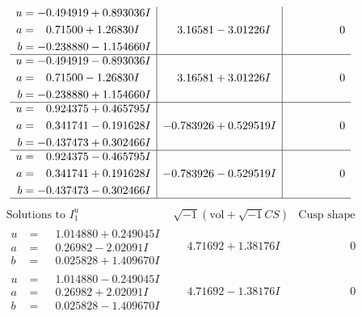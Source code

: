 \documentclass[1p]{elsarticle_modified}
\theoremstyle{definition}
\newcommand{\I}{\sqrt{-1}}
\begin{document}
$$\begin{array}{c|c|c}
\begin{aligned}
u &= -0.494919 + 0.893036 I \\
a &= \phantom{-}0.71500 + 1.26830 I \\
b &= -0.238880 - 1.154660 I\end{aligned}
 & \phantom{-}3.16581 - 3.01226 I & \phantom{-0.000000 } 0 \\ \hline\begin{aligned}
u &= -0.494919 - 0.893036 I \\
a &= \phantom{-}0.71500 - 1.26830 I \\
b &= -0.238880 + 1.154660 I\end{aligned}
 & \phantom{-}3.16581 + 3.01226 I & \phantom{-0.000000 } 0 \\ \hline\begin{aligned}
u &= \phantom{-}0.924375 + 0.465795 I \\
a &= \phantom{-}0.341741 - 0.191628 I \\
b &= -0.437473 + 0.302466 I\end{aligned}
 & -0.783926 + 0.529519 I & \phantom{-0.000000 } 0 \\ \hline\begin{aligned}
u &= \phantom{-}0.924375 - 0.465795 I \\
a &= \phantom{-}0.341741 + 0.191628 I \\
b &= -0.437473 - 0.302466 I\end{aligned}
 & -0.783926 - 0.529519 I & \phantom{-0.000000 } 0\\
 \hline 
 \end{array}$$\newpage$$\begin{array}{c|c|c}  
\text{Solutions to }I^u_{1}& \I (\text{vol} + \sqrt{-1}CS) & \text{Cusp shape}\\
 \hline 
\begin{aligned}
u &= \phantom{-}1.014880 + 0.249045 I \\
a &= \phantom{-}0.26982 - 2.02091 I \\
b &= \phantom{-}0.025828 + 1.409670 I\end{aligned}
 & \phantom{-}4.71692 + 1.38176 I & \phantom{-0.000000 } 0 \\ \hline\begin{aligned}
u &= \phantom{-}1.014880 - 0.249045 I \\
a &= \phantom{-}0.26982 + 2.02091 I \\
b &= \phantom{-}0.025828 - 1.409670 I\end{aligned}
 & \phantom{-}4.71692 - 1.38176 I & \phantom{-0.000000 } 0 \\ \hline\begin{aligned}

\end{aligned}
\end{array}$$
\end{document}

